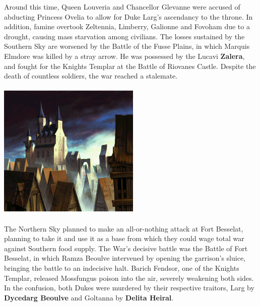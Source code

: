 Around this time, Queen Louveria and Chancellor Glevanne were accused of abducting Princess Ovelia to allow for Duke Larg's ascendancy to the throne. In addition, famine overtook Zeltennia, Limberry, Galionne and Fovoham due to a drought, causing mass starvation among civilians.
The losses sustained by the Southern Sky are worsened by the Battle of the Fusse Plains, in which Marquis Elmdore was killed by a stray arrow. 
He was possessed by the Lucavi \textbf{Zalera}, and fought for the Knights Templar at the Battle of Riovanes Castle.
Despite the death of countless soldiers, the war reached a stalemate.
%
\\\\
\includegraphics[width=\columnwidth]{./art/images/riovanes.jpg}
\\\\
% 
The Northern Sky planned to make an all-or-nothing attack at Fort Besselat, planning to take it and use it as a base from which they could wage total war against Southern food supply.
The War's decisive battle was the Battle of Fort Besselat, in which Ramza Beoulve intervened by opening the garrison's sluice, bringing the battle to an indecisive halt. 
Barich Fendsor, one of the Knights Templar, released Mossfungus poison into the air, severely weakening both sides. 
In the confusion, both Dukes were murdered by their respective traitors, Larg by \textbf{Dycedarg Beoulve} and Goltanna by \textbf{Delita Heiral}. 
